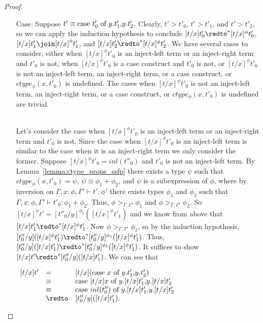 \begin{proof}
\begin{itemize}
\item[Case.] Suppose $t' \equiv \mbox{case}\ t'_0\ \text{of}\ y\text{.}t'_1\text{,}y\text{.}t'_2$.  Clearly, $t' > t'_0$,
  $t' > t'_1$, and $t' > t'_2$, so we can apply the induction hypothesis to conclude 
  $[t/x]t'_0 \redto^* [t/x]^\phi t'_0$, $[t/x]t'_1 \join [t/x]^\phi t'_1$, and 
  $[t/x]t'_2 \redto^* [t/x]^\phi t'_2$.  We have several cases to consider, either when $[t/x]^\phi t'_0$ is an
  inject-left term or an inject-right term and $t'_0$ is not, when $[t/x]^\phi t'_0$ is a case construct
  and $t'_0$ is not, or $[t/x]^\phi t'_0$ is not an inject-left term, an inject-right term, or a case construct, or
  $ctype_\phi(x,t'_0)$ is undefined.  The cases when $[t/x]^\phi t'_0$ is not an inject-left term, an inject-right term, 
  or a case construct, or $ctype_\phi(x,t'_0)$ is undefined are trivial.
  
  \ \\
  Let's consider the case when $[t/x]^\phi t'_0$ is an inject-left term or an inject-right term and 
  $t'_0$ is not.  Since the case when $[t/x]^\phi t'_0$ is an inject-left term is similar to the case when
  it is an inject-right term we only consider the former.  Suppose $[t/x]^\phi t'_0 = inl(t''_0)$ and 
  $t'_0$ is not an inject-left term.  By Lemma~\ref{lemma:ctype_props_ssfp} there exists a type
  $\psi$ such that $ctype_\phi(x,t'_0) = \psi$, $\psi \equiv \phi_1+\phi_2$, and $\psi$ is a subexpression
  of $\phi$, where by inversion on $\Gamma,x:\phi,\Gamma' \vdash t':\phi'$ there exists types $\phi_1$ and
  $\phi_2$ such that $\Gamma,x:\phi,\Gamma' \vdash t'_0:\phi_1+\phi_2$.  Thus, $\phi >_{\Gamma,\Gamma'} \phi_1$
  and $\phi >_{\Gamma,\Gamma'} \phi_2$.  So $[t/x]^\phi t' = [t''_0/y]^{\phi_1} ([t/x]^{\phi} t'_1)$ and we know from above
  that $[t/x]t'_1 \redto^* [t/x]^{\phi} t'_1$.  Now $\phi >_{\Gamma,\Gamma'} \phi_1$, so by the induction
  hypothesis, $[t''_0/y]([t/x]^{\phi} t'_1) \redto^* [t''_0/y]^{\phi_1}([t/x]^\phi t'_1)$.  Thus,
  $[t''_0/y]([t/x] t'_1) \redto^* [t''_0/y]^{\phi_1}([t/x]^\phi t'_1)$.  It suffices to show 
  $ [t/x]t' \redto^* [t''_0/y]([t/x] t'_1)$.  We can see that 
  \begin{center}
    \begin{math}
      \begin{array}{lll}
        [t/x]t' & = & [t/x](\ccon{x}{y}{t'_1}{t'_2})\\
        & \equiv & \ccon{[t/x]x}{y}{[t/x]t'_1}{[t/x]t'_2}\\
        & \equiv & \ccon{inl(t''_0)}{y}{[t/x]t'_1}{[t/x]t'_2}\\
        & \redto & [t''_0/y]([t/x]t'_1).
      \end{array}
    \end{math}
  \end{center}
  

\end{itemize}
\end{proof}
